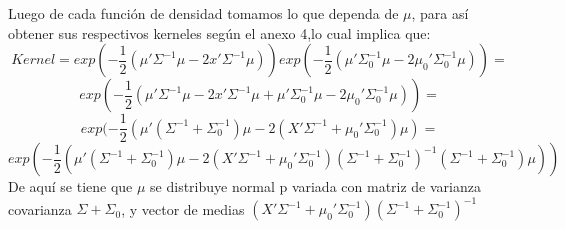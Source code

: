 \documentclass[11pt]{book}
\begin{document}
Luego de cada función de densidad tomamos lo que dependa de $\mu$, para así obtener sus respectivos kerneles según el anexo 4,lo cual implica que:
\begin{equation*}
Kernel=exp(-\dfrac{1}{2}(\mu'\Sigma^{-1}\mu -2x'\Sigma^{-1}\mu))exp(-\dfrac{1}{2}(\mu'\Sigma_{0}^{-1}\mu -2\mu_{0}'\Sigma_{0}^{-1}\mu))=
\end{equation*} 
\begin{equation*}
exp(-\dfrac{1}{2}(\mu'\Sigma^{-1}\mu -2x'\Sigma^{-1}\mu + \mu'\Sigma_{0}^{-1}\mu -2\mu_{0}'\Sigma_{0}^{-1}\mu))=
\end{equation*}
\begin{equation*}
exp(-\frac{1}{2}(\mu'(\Sigma^{-1}+\Sigma_{0}^{-1})\mu-2(X'\Sigma^{-1}+\mu_{0}'\Sigma_{0}^{-1})\mu)=
\end{equation*}
\begin{equation*}
exp(-\frac{1}{2}(\mu'(\Sigma^{-1}+\Sigma_{0}^{-1})\mu-2(X'\Sigma^{-1}+\mu_{0}'\Sigma_{0}^{-1})(\Sigma^{-1}+\Sigma_{0}^{-1})^{-1}(\Sigma^{-1}+\Sigma_{0}^{-1})\mu))
\end{equation*}
De aquí se tiene que $\mu$ se distribuye normal p variada con matriz de varianza covarianza $\Sigma + \Sigma_{0}$, y vector de medias $(X'\Sigma^{-1}+\mu_{0}'\Sigma_{0}^{-1})(\Sigma^{-1}+\Sigma_{0}^{-1})^{-1}$




\appendix %



\thispagestyle{empty}
%
%



\backmatter
\nocite{*}

\end{document}
